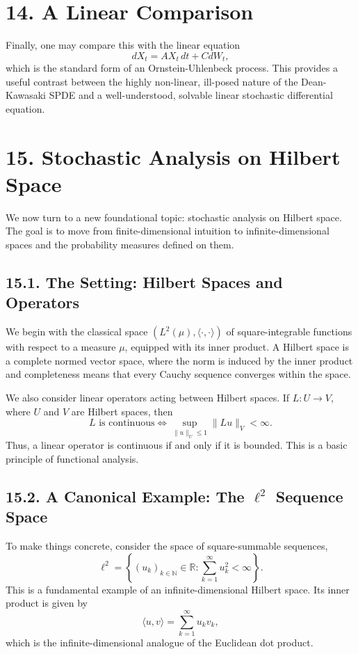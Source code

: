 \documentclass[11pt]{article}
\theoremstyle{definition}
\theoremstyle{remark}
\begin{document}
\section*{14. A Linear Comparison}
Finally, one may compare this with the linear equation
\[
dX_t=AX_t\,dt+CdW_t,
\]
which is the standard form of an Ornstein-Uhlenbeck process. This provides a useful contrast between the highly non-linear, ill-posed nature of the Dean-Kawasaki SPDE and a well-understood, solvable linear stochastic differential equation.

\section*{15. Stochastic Analysis on Hilbert Space}
We now turn to a new foundational topic: stochastic analysis on Hilbert space. The goal is to move from finite-dimensional intuition to infinite-dimensional spaces and the probability measures defined on them.

\subsection*{15.1. The Setting: Hilbert Spaces and Operators}
We begin with the classical space $(L^2(\mu),\langle\cdot,\cdot\rangle)$ of square-integrable functions with respect to a measure $\mu$, equipped with its inner product. A Hilbert space is a complete normed vector space, where the norm is induced by the inner product and completeness means that every Cauchy sequence converges within the space.

We also consider linear operators acting between Hilbert spaces. If $L:U\to V$, where $U$ and $V$ are Hilbert spaces, then
\[
L \text{ is continuous} \iff \sup_{\|u\|_U\le 1}\|Lu\|_V<\infty.
\]
Thus, a linear operator is continuous if and only if it is bounded. This is a basic principle of functional analysis.

\subsection*{15.2. A Canonical Example: The $\ell^2$ Sequence Space}
To make things concrete, consider the space of square-summable sequences,
\[
\ell^2=\left\{(u_k)_{k\in\mathbb N}\in\mathbb R:\sum_{k=1}^\infty u_k^2<\infty\right\}.
\]
This is a fundamental example of an infinite-dimensional Hilbert space. Its inner product is given by
\[
\langle u,v\rangle=\sum_{k=1}^\infty u_kv_k,
\]
which is the infinite-dimensional analogue of the Euclidean dot product.
\end{document}
